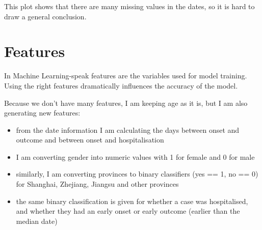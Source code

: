 \documentclass[]{book}
\begin{document}
This plot shows that there are many missing values in the dates, so it is hard to draw a general conclusion.

\hypertarget{features}{%
\section{Features}\label{features}}

In Machine Learning-speak features are the variables used for model training. Using the right features dramatically influences the accuracy of the model.

Because we don't have many features, I am keeping age as it is, but I am also generating new features:

\begin{itemize}
\item
  from the date information I am calculating the days between onset and outcome and between onset and hospitalisation
\item
  I am converting gender into numeric values with 1 for female and 0 for male
\item
  similarly, I am converting provinces to binary classifiers (yes == 1, no == 0) for Shanghai, Zhejiang, Jiangsu and other provinces
\item
  the same binary classification is given for whether a case was hospitalised, and whether they had an early onset or early outcome (earlier than the median date)
\end{itemize}
\end{document}
